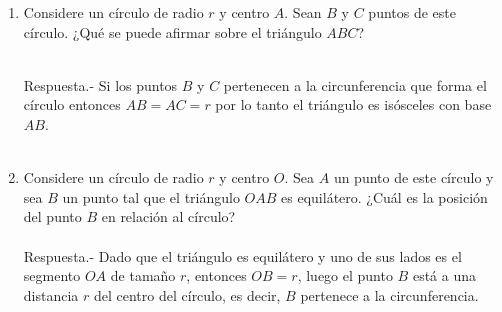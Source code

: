 \begin{enumerate}
    \item Considere un círculo de radio $r$ y centro $A$. Sean $B$ y $C$ puntos de este círculo. ¿Qué se puede afirmar sobre el triángulo $ABC$?\\\\
    \begin{center}
    \end{center}
    Respuesta.-\; Si los puntos $B$ y $C$ pertenecen a la circunferencia que forma el círculo entonces $AB = AC = r$ por lo tanto el triángulo es isósceles con base $AB$.\\\\

    \item Considere un círculo de radio $r$ y centro $O$. Sea $A$ un punto de este círculo y sea $B$ un punto tal que el triángulo $OAB$ es equilátero. ¿Cuál es la posición del punto $B$ en relación al círculo?\\\\
    Respuesta.-\; Dado que el triángulo es equilátero y uno de sus lados es el segmento $OA$ de tamaño $r$, entonces $OB = r$, luego el punto $B$ está a una distancia $r$ del centro del círculo, es decir, $B$ pertenece a la circunferencia.\\\\


\end{enumerate}
